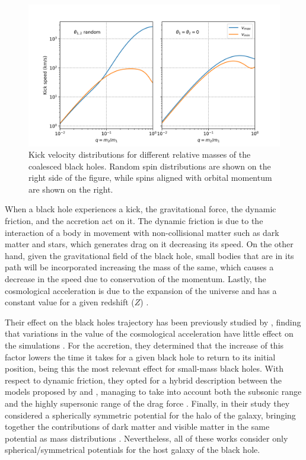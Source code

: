 	\begin{figure}[h]
		\centering
		\includegraphics[width=0.9\linewidth]{"../Files/Week 10/Tanaka"}
		\caption{Kick velocity distributions for different relative masses of the coalesced black holes. Random spin distributions are shown on the right side of the figure, while spins aligned with orbital momentum are shown on the right.}
		\label{fig: tanakaSpeeds}
	\end{figure}
	
	When a black hole experiences a kick, the gravitational force, the dynamic friction, and the accretion act on it. The dynamic friction is due to the interaction of a body in movement with non-collisional matter such as dark matter and stars, which generates drag on it decreasing its speed. On the other hand, given the gravitational field of the black hole, small bodies that are in its path will be incorporated increasing the mass of the same, which causes a decrease in the speed due to conservation of the momentum. Lastly, the cosmological acceleration is due to the expansion of the universe and has a constant value for a given redshift ($Z$) \cite{choksi2017recoiling}.
	
	Their effect on the black holes trajectory has been previously studied by \citeauthor{choksi2017recoiling}, finding that variations in the value of the cosmological acceleration have little effect on the simulations \cite{choksi2017recoiling}. For the accretion, they determined that the increase of this factor lowers the time it takes for a given black hole to return to its initial position, being this the most relevant effect for small-mass black holes. With respect to dynamic friction, they opted for a hybrid description between the models proposed by \citeauthor{ostriker1999dynamical} and \citeauthor{escala2005role}, managing to take into account both the subsonic range and the highly supersonic range of the drag force \cite{ostriker1999dynamical, escala2005role}. Finally, in their study they considered a spherically symmetric potential for the halo of the galaxy, bringing together the contributions of dark matter and visible matter in the same potential as mass distributions \cite{choksi2017recoiling}. Nevertheless, all of these works consider only spherical/symmetrical potentials for the host galaxy of the black hole.
	
